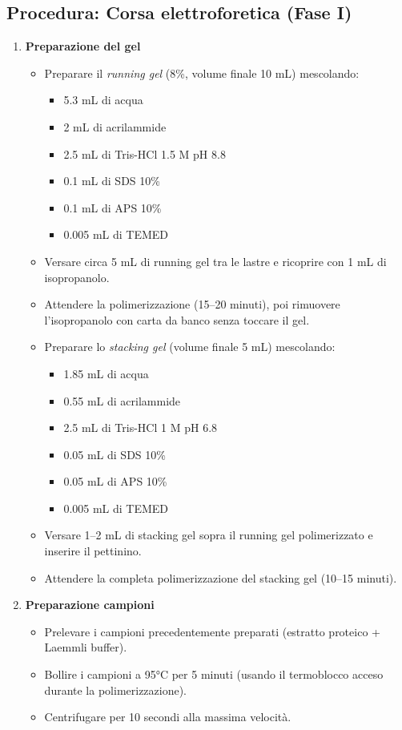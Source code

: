 \subsection{Procedura: Corsa elettroforetica (Fase I)}
\begin{enumerate}
\item \textbf{Preparazione del gel}
  \begin{itemize}
    \item Preparare il \textit{running gel} (8\%, volume finale 10 mL) mescolando:
      \begin{itemize}
        \item 5.3 mL di acqua
        \item 2 mL di acrilammide
        \item 2.5 mL di Tris-HCl 1.5 M pH 8.8
        \item 0.1 mL di SDS 10\%
        \item 0.1 mL di APS 10\%
        \item 0.005 mL di TEMED
      \end{itemize}
    \item Versare circa 5 mL di running gel tra le lastre e ricoprire con 1 mL di isopropanolo.
    \item Attendere la polimerizzazione (15–20 minuti), poi rimuovere l’isopropanolo con carta da banco senza toccare il gel.
    \item Preparare lo \textit{stacking gel} (volume finale 5 mL) mescolando:
      \begin{itemize}
        \item 1.85 mL di acqua
        \item 0.55 mL di acrilammide
        \item 2.5 mL di Tris-HCl 1 M pH 6.8
        \item 0.05 mL di SDS 10\%
        \item 0.05 mL di APS 10\%
        \item 0.005 mL di TEMED
      \end{itemize}
    \item Versare 1–2 mL di stacking gel sopra il running gel polimerizzato e inserire il pettinino.
    \item Attendere la completa polimerizzazione del stacking gel (10–15 minuti).
  \end{itemize}


\item \textbf{Preparazione campioni}
  \begin{itemize}
    \item Prelevare i campioni precedentemente preparati (estratto proteico + Laemmli buffer).
    \item Bollire i campioni a 95°C per 5 minuti (usando il termoblocco acceso durante la polimerizzazione).
    \item Centrifugare per 10 secondi alla massima velocità.
  \end{itemize}


\end{enumerate}
